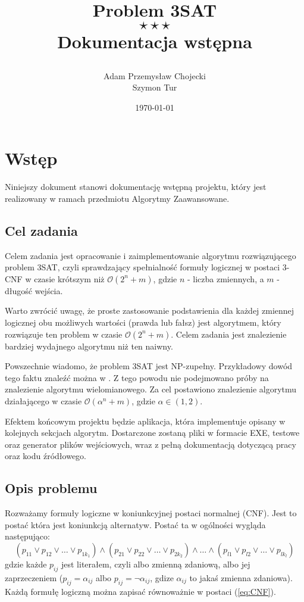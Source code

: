 \documentclass[a4paper,10pt,twoside]{report}
\date{\today} %
\author{
Adam Przemysław Chojecki \\ Szymon Tur
}
\title{\bf Problem 3SAT \\ $\star\star\star$ \\ Dokumentacja wstępna \par}
\theoremstyle{definition}
\begin{document}
\maketitle

\tableofcontents
\thispagestyle{empty}

\null\thispagestyle{empty}\newpage
{}
\pagestyle{fancy}
\setcounter{page}{3}

\chapter{Wstęp}

Niniejszy dokument stanowi dokumentację wstępną projektu, który jest realizowany w ramach przedmiotu Algorytmy Zaawansowane.

\section{Cel zadania}
Celem zadania jest opracowanie i zaimplementowanie algorytmu rozwiązującego problem 3SAT, czyli sprawdzający spełnialność formuły logicznej w postaci 3-CNF w czasie krótszym niż $\mathcal{O}(2^n + m)$, gdzie $n$ - liczba zmiennych, a $m$ - długość wejścia.

Warto zwrócić uwagę, że proste zastosowanie podstawienia dla każdej zmiennej logicznej obu możliwych wartości (prawda lub fałsz) jest algorytmem, który rozwiązuje ten problem w czasie $\mathcal{O}(2^n + m)$. Celem zadania jest znalezienie bardziej wydajnego algorytmu niż ten naiwny.

Powszechnie wiadomo, że problem 3SAT jest NP-zupełny. Przykładowy dowód tego faktu znaleźć można w \cite{sipser-2009}. Z tego powodu nie podejmowano próby na znalezienie algorytmu wielomianowego. Za cel postawiono znalezienie algorytmu działającego w czasie $\mathcal{O}(\alpha^n + m)$, gdzie $\alpha \in (1,2)$.

Efektem końcowym projektu będzie aplikacja, która implementuje opisany w kolejnych sekcjach algorytm. Dostarczone zostaną pliki w formacie EXE, testowe oraz generator plików wejściowych, wraz z pełną dokumentacją dotyczącą pracy oraz kodu źródłowego.

\section{Opis problemu}\label{sec:opis_problemu}

Rozważamy formuły logiczne w koniunkcyjnej postaci normalnej (CNF). Jest to postać która jest koniunkcją alternatyw. Postać ta w ogólności wygląda następująco:
\begin{equation}
\label{eq:CNF}
(p_{11} \lor p_{12} \lor\dots\lor p_{1k_1})\land (p_{21} \lor p_{22} \lor\dots\lor p_{2k_2})\land\dots\land (p_{l1} \lor p_{l2} \lor\dots\lor p_{lk_l})
\end{equation}
gdzie każde $p_{ij}$ jest literałem, czyli albo zmienną zdaniową, albo jej zaprzeczeniem ($p_{ij} = \alpha_{ij}$ albo $p_{ij} = \lnot\alpha_{ij}$, gdize $\alpha_{ij}$ to jakaś zmienna zdaniowa). Każdą formułę logiczną można zapisać równoważnie w postaci (\ref{eq:CNF}).
\end{document}
